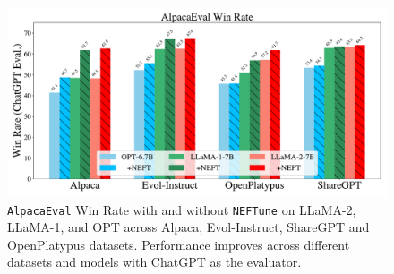 \documentclass{article} %
\newcommand{\neftune}{\texttt{NEFTune}}
\newcommand{\llama}{LLaMA}
\begin{document}
\begin{figure}
    \centering
    \includegraphics[width=\linewidth,trim={0cm 0.6cm 0cm 0.6cm},clip]{figures/Ablation_Model_Dataset_ChatGPT.pdf}
    \caption{\texttt{AlpacaEval} Win Rate with and without \neftune{} on \llama{}-2, \llama{}-1, and OPT across Alpaca, Evol-Instruct, ShareGPT and OpenPlatypus datasets. Performance improves across different datasets and models with ChatGPT as the evaluator.}
    \label{fig:AlpacaEval_model_dataset_ablation}
\end{figure}
\end{document}
